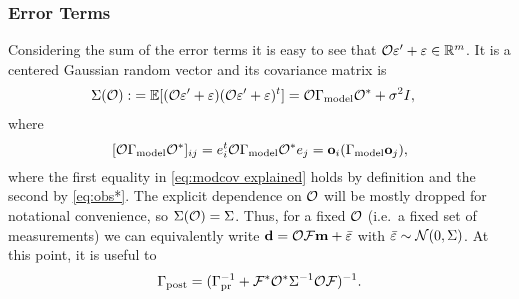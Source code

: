 \documentclass{amsart}
\numberwithin{equation}{section}
\begin{document}
\subsubsection{Error Terms}
Considering the sum of the error terms it is easy to see that $\mathcal{O}
\varepsilon' + \varepsilon \in \mathbb{R}^m$. It is a centered Gaussian random vector and
its covariance matrix is
\begin{align}\label{eq:Sigma}
  \begin{split}
    \Sigma(\mathcal{O}) :&= \mathbb{E}[ (\mathcal{O} \varepsilon' + \varepsilon)  (\mathcal{O} \varepsilon' + \varepsilon)^t ] 
    = \mathcal{O} \Gamma_{\textup{model}} \mathcal{O}^* + \sigma^2I , 
  \end{split}
\end{align}
where
\begin{equation}\label{eq:modcov explained}
  [\mathcal{O} \Gamma_{\textup{model}} \mathcal{O}^*]_{ij} = e_i^t \mathcal{O} \Gamma_{\textup{model}} \mathcal{O}^* e_j = \mathbf{o}_i (\Gamma_{\textup{model}} \mathbf{o}_j),
\end{equation}
where the first equality in \eqref{eq:modcov explained} holds by
definition and the second by \eqref{eq:obs*}. The explicit dependence
on $\mathcal{O}$ will be mostly dropped for notational convenience, so
$\Sigma(\mathcal{O}) = \Sigma$. Thus, for a fixed $\mathcal{O}$ (i.e.\ a fixed set
of measurements) we can equivalently write $\mathbf{d} = \mathcal{O} \mathcal{F} \mathbf{m} +
\bar{\varepsilon}$ with $\bar{\varepsilon} \sim \mathcal{N}(0,\Sigma)$. At this point,
it is useful to 
\begin{align}\label{eq:postcov}
  \Gamma_{\textup{post}} = (\Gamma_{\textup{pr}}^{-1} + \mathcal{F}^* \mathcal{O}^* \Sigma^{-1} \mathcal{O} \mathcal{F}
  )^{-1}.
\end{align}
\end{document}
